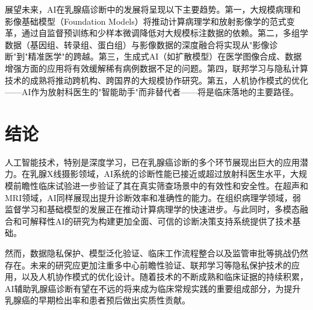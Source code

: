 \documentclass[12pt,a4paper]{article}
\begin{document}
展望未来，AI在乳腺癌诊断中的发展将呈现以下主要趋势。第一，大规模病理和影像基础模型（Foundation Models）将推动计算病理学和放射影像学的范式变革，通过自监督预训练和少样本微调降低对大规模标注数据的依赖\citep{chen2022scaling}。第二，多组学数据（基因组、转录组、蛋白组）与影像数据的深度融合将实现从"影像诊断"到"精准医学"的跨越。第三，生成式AI（如扩散模型）在医学图像合成、数据增强方面的应用将有效缓解稀有病例数据不足的问题。第四，联邦学习与隐私计算技术的成熟将推动跨机构、跨国界的大规模协作研究\citep{rieke2020future}。第五，人机协作模式的优化——AI作为放射科医生的"智能助手"而非替代者——将是临床落地的主要路径\citep{lang2023artificial, dembrower2023artificial}。

\section{结论}

人工智能技术，特别是深度学习，已在乳腺癌诊断的多个环节展现出巨大的应用潜力。在乳腺X线摄影领域，AI系统的诊断性能已接近或超过放射科医生水平，大规模前瞻性临床试验进一步验证了其在真实筛查场景中的有效性和安全性。在超声和MRI领域，AI同样展现出提升诊断效率和准确性的能力。在组织病理学领域，弱监督学习和基础模型的发展正在推动计算病理学的快速进步。与此同时，多模态融合和可解释性AI的研究为构建更加全面、可信的诊断决策支持系统提供了技术基础。

然而，数据隐私保护、模型泛化验证、临床工作流程整合以及监管审批等挑战仍然存在。未来的研究应更加注重多中心前瞻性验证、联邦学习等隐私保护技术的应用，以及人机协作模式的优化设计。随着技术的不断成熟和临床证据的持续积累，AI辅助乳腺癌诊断有望在不远的将来成为临床常规实践的重要组成部分，为提升乳腺癌的早期检出率和患者预后做出实质性贡献。


\end{document}
